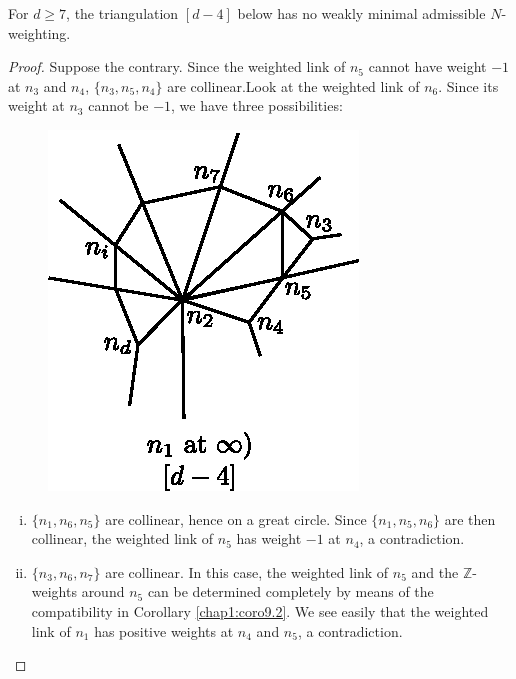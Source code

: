 \begin{lemma}[Nagaya]\label{chap1:lem9.10}
 For $d \geq 7$, the triangulation $[d-4]$ below has no weakly
  minimal admissible $N$-weighting. 
\end{lemma}

\begin{proof}
Suppose the contrary. Since the weighted link of $n_5$ cannot have
weight $-1$ at $n_3$ and $n_4$, $\{n_3, n_5, n_4\}$ are
collinear.\pageoriginale Look at the weighted link of $n_6$. Since its
weight at $n_3$ cannot be $-1$, we have three possibilities:  
\begin{figure}[H]
\centering 
\includegraphics[scale=0.7]{vol58-fig/fig58-44.eps} 
\end{figure}

  \begin{enumerate}[(i)]
 \item $\{n_1, n_6, n_5\}$ are collinear, hence on a great
   circle. Since $\{n_1, n_5, n_6\}$ are then collinear, the weighted
   link of $n_5$ has weight $-1$ at $n_4$, a contradiction. 
 \item $\{n_3, n_6, n_7\}$ are collinear. In this case, the weighted
   link of $n_5$ and the $\mathbb{Z}$-weights around $n_5$ can be
   determined completely by means of the compatibility in Corollary
   \ref{chap1:coro9.2}. We see easily that the weighted link of $n_1$ has positive
   weights at $n_4$ and $n_5$, a contradiction. 


\end{enumerate}
\end{proof}
